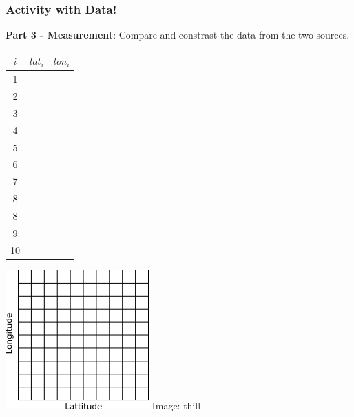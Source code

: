 \documentclass[fleqn]{beamer} %
\newcommand{\sectiontitleIV}{Activity with Data!}
\begin{document}
	\begin{frame}[label=sectionIV]
		\frametitle{\sectiontitleIV}
		\scriptsize
		{\bf Part 3 - Measurement}: Compare and constrast the data from the two sources.  \vspc
		
		\begin{multicols}{2}

			\setlength{\tabcolsep}{20pt}
			\renewcommand{\arraystretch}{1.4}
			\begin{tabular}{|c|c|c|} \hline
			$i$ & $lat_i$ & $lon_i$ \\\hline
			  1  & &              \\ \hline
			  2  & &              \\ \hline
			  3  & &              \\ \hline
			  4  & &              \\ \hline
			  5  & &              \\ \hline
			  6  & &              \\ \hline
			  7  & &              \\ \hline
			  8  & &              \\ \hline
			  8  & &              \\ \hline		
			  9  & &              \\ \hline
             10  & &              \\ \hline
			\end{tabular}

			\includegraphics[scale=1]{lat_lon_grid.png}
			{\tiny Image: thill}
		\end{multicols}	

	\end{frame}
\end{document}
